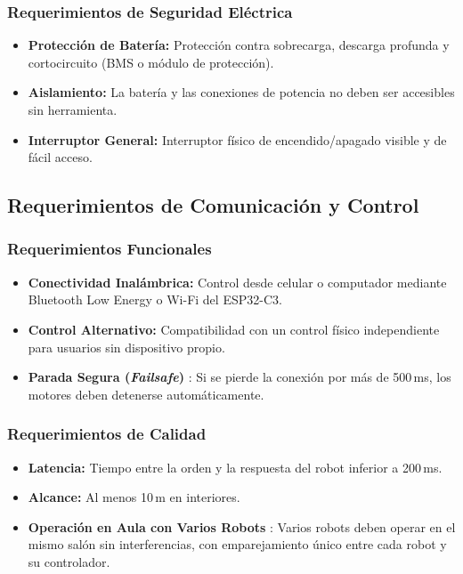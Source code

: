 \documentclass[11pt]{article}
\begin{document}
\subsubsection{Requerimientos de Seguridad Eléctrica }
\begin{itemize}
  \item \textbf{Protección de Batería:} Protección contra sobrecarga, descarga profunda y cortocircuito (BMS o módulo de protección).
  \item \textbf{Aislamiento:} La batería y las conexiones de potencia no deben ser accesibles sin herramienta.
  \item \textbf{Interruptor General:} Interruptor físico de encendido/apagado visible y de fácil acceso.
\end{itemize}
 

\subsection{Requerimientos de Comunicación y Control}
 
\subsubsection{Requerimientos Funcionales}
\begin{itemize}
  \item \textbf{Conectividad Inalámbrica:} Control desde celular o computador mediante Bluetooth Low Energy o Wi-Fi del ESP32-C3.
  \item \textbf{Control Alternativo:} Compatibilidad con un control físico independiente para usuarios sin dispositivo propio.
  \item \textbf{Parada Segura (\textit{Failsafe})} : Si se pierde la conexión por más de 500\,ms, los motores deben detenerse automáticamente.
\end{itemize}
 
\subsubsection{Requerimientos de Calidad}
\begin{itemize}
  \item \textbf{Latencia:} Tiempo entre la orden y la respuesta del robot inferior a 200\,ms.
  \item \textbf{Alcance:} Al menos 10\,m en interiores.
  \item \textbf{Operación en Aula con Varios Robots} : Varios robots deben operar en el mismo salón sin interferencias, con emparejamiento único entre cada robot y su controlador.
\end{itemize}
 
\end{document}

